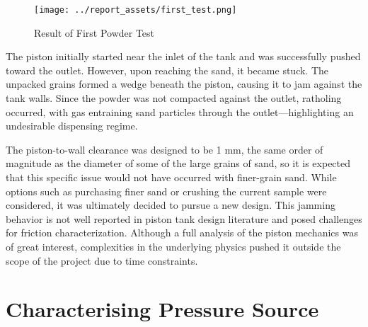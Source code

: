 \begin{figure}[htbp]
    \centering
    
    \begin{minipage}{0.6\textwidth}
        \centering
        \texttt{[image: ../report\_assets/first\_test.png]}
        \caption{Result of First Powder Test}\label{fig:first-test}
    \end{minipage}
    
\end{figure}
The piston initially started near the inlet of the tank and was successfully pushed toward the outlet. However, upon reaching the sand, it became stuck. The unpacked grains formed a wedge beneath the piston, causing it to jam against the tank walls. Since the powder was not compacted against the outlet, ratholing occurred, with gas entraining sand particles through the outlet—highlighting an undesirable dispensing regime.

The piston-to-wall clearance was designed to be 1 mm, the same order of magnitude as the diameter of some of the large grains of sand, so it is expected that this specific issue would not have occurred with finer-grain sand. While options such as purchasing finer sand or crushing the current sample were considered, it was ultimately decided to pursue a new design. This jamming behavior is not well reported in piston tank design literature and posed challenges for friction characterization. Although a full analysis of the piston mechanics was of great interest, complexities in the underlying physics pushed it outside the scope of the project due to time constraints.

\section{Characterising Pressure Source}\label{sec:static_test}
